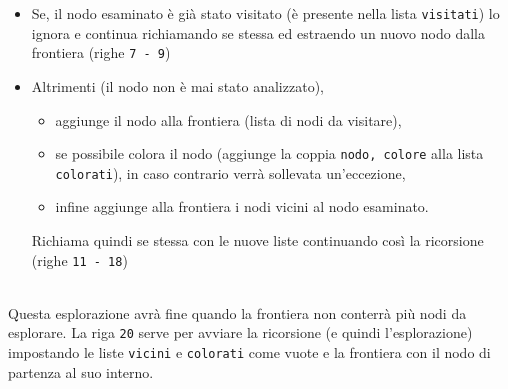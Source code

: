 \begin{itemize}
	\item Se, il nodo esaminato è già stato visitato (è presente nella lista \lstinline[style=cmd]|visitati|) lo ignora e continua richiamando se stessa ed estraendo un nuovo nodo dalla frontiera (righe \lstinline[style=cmd]|7 - 9|)
	\item Altrimenti (il nodo non è mai stato analizzato), 
		\begin{itemize}
			\item aggiunge il nodo alla frontiera (lista di nodi da visitare),
			\item se possibile colora il nodo (aggiunge la coppia \lstinline[style=cmd]|nodo, colore| alla lista \lstinline[style=cmd]|colorati|), in caso contrario verrà sollevata un'eccezione, 
			\item infine aggiunge alla frontiera i nodi vicini al nodo esaminato. 
		\end{itemize}
	Richiama quindi se stessa con le nuove liste continuando così la ricorsione (righe \lstinline[style=cmd]|11 - 18|)
\end{itemize}
\ \\
Questa esplorazione avrà fine quando la frontiera non conterrà più nodi da esplorare.
La riga \lstinline[style=cmd]|20| serve per avviare la ricorsione (e quindi l'esplorazione) impostando le liste \lstinline[style=cmd]|vicini| e \lstinline[style=cmd]|colorati| come vuote e la frontiera con il nodo di partenza al suo interno. 



